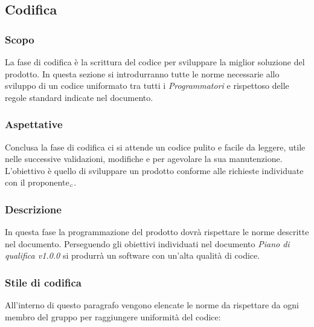 \subsection{Codifica}\label{ProcessiPrimariCodifica}

\subsubsection{Scopo}\label{ProcessiPrimariCodificaScopo}
La fase di codifica è la scrittura del codice per sviluppare la miglior soluzione del prodotto. In questa sezione si introdurranno tutte le norme necessarie allo sviluppo di un codice uniformato tra tutti i \textit{Programmatori} e rispettoso delle regole standard indicate nel documento.
\subsubsection{Aspettative}\label{ProcessiPrimariCodificaAspettative}
Conclusa la fase di codifica ci si attende un codice pulito e facile da leggere, utile nelle successive validazioni, modifiche e per agevolare la sua manutenzione. L'obiettivo è quello di sviluppare un prodotto conforme alle richieste individuate con il proponente$_{\scaleto{G}{3pt}}$. 

\subsubsection{Descrizione}\label{ProcessiPrimariCodificaDescrizione}
In questa fase la programmazione del prodotto dovrà rispettare le norme descritte nel documento. Perseguendo gli obiettivi individuati nel documento \textit{Piano di qualifica v1.0.0} si produrrà un software con un'alta qualità di codice.

\subsubsection{Stile di codifica}\label{ProcessiPrimariCodificaStileDiCodifica}
All'interno di questo paragrafo vengono elencate le norme da rispettare da ogni membro del gruppo per raggiungere uniformità del codice:

